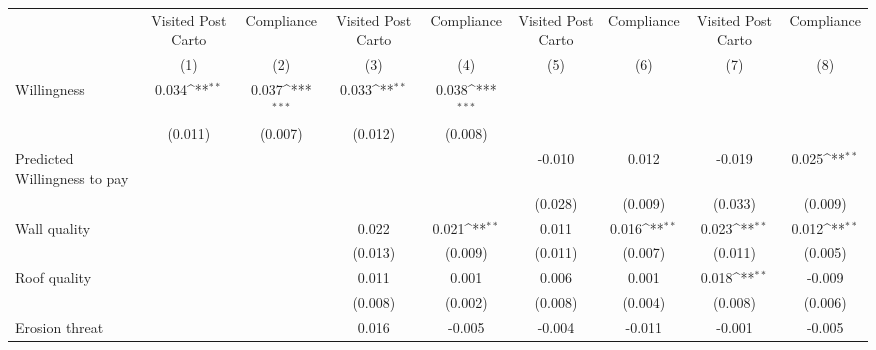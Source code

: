 {
\def\sym#1{\ifmmode^{#1}\else\(^{#1}\)\fi}
\begin{tabular}{l*{8}{c}}
\toprule
                &\multicolumn{1}{c}{Visited Post Carto}&\multicolumn{1}{c}{Compliance}&\multicolumn{1}{c}{Visited Post Carto}&\multicolumn{1}{c}{Compliance}&\multicolumn{1}{c}{Visited Post Carto}&\multicolumn{1}{c}{Compliance}&\multicolumn{1}{c}{Visited Post Carto}&\multicolumn{1}{c}{Compliance}\\
                &\multicolumn{1}{c}{(1)}         &\multicolumn{1}{c}{(2)}         &\multicolumn{1}{c}{(3)}         &\multicolumn{1}{c}{(4)}         &\multicolumn{1}{c}{(5)}         &\multicolumn{1}{c}{(6)}         &\multicolumn{1}{c}{(7)}         &\multicolumn{1}{c}{(8)}         \\
\midrule
Willingness     &    0.034\sym{**} &    0.037\sym{***}&    0.033\sym{**} &    0.038\sym{***}&                  &                  &                  &                  \\
                &  (0.011)         &  (0.007)         &  (0.012)         &  (0.008)         &                  &                  &                  &                  \\
Predicted Willingness to pay&                  &                  &                  &                  &   -0.010         &    0.012         &   -0.019         &    0.025\sym{**} \\
                &                  &                  &                  &                  &  (0.028)         &  (0.009)         &  (0.033)         &  (0.009)         \\
Wall quality    &                  &                  &    0.022         &    0.021\sym{**} &    0.011         &    0.016\sym{**} &    0.023\sym{**} &    0.012\sym{**} \\
                &                  &                  &  (0.013)         &  (0.009)         &  (0.011)         &  (0.007)         &  (0.011)         &  (0.005)         \\
Roof quality    &                  &                  &    0.011         &    0.001         &    0.006         &    0.001         &    0.018\sym{**} &   -0.009         \\
                &                  &                  &  (0.008)         &  (0.002)         &  (0.008)         &  (0.004)         &  (0.008)         &  (0.006)         \\
Erosion threat  &                  &                  &    0.016         &   -0.005         &   -0.004         &   -0.011         &   -0.001         &   -0.005         \\

\end{tabular}}
